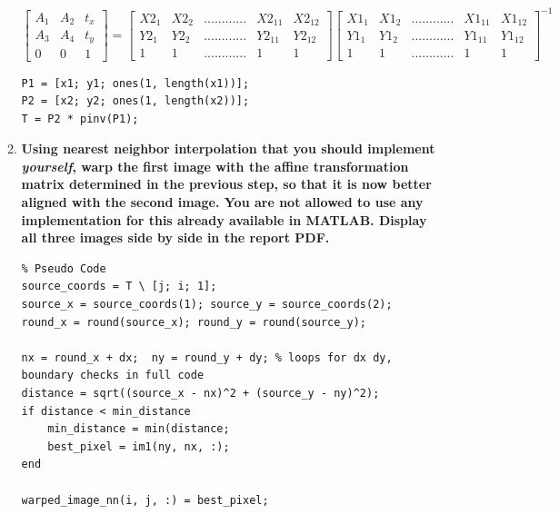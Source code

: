 \documentclass{article}
\begin{document}
\begin{enumerate}
\begin{enumerate}
\begin{equation}
    \begin{bmatrix}
    A_1 & A_2 & t_x\\
    A_3 & A_4 & t_y\\
    0 & 0 & 1
    \end{bmatrix}
          =
    \begin{bmatrix}
        X2_1 & X2_2 & ............ & X2_{11} & X2_{12} \\
        Y2_1 & Y2_2 & ............ & Y2_{11} & Y2_{12} \\
        1    & 1    & ............ & 1     & 1
    \end{bmatrix}
    \begin{bmatrix}
        X1_1 & X1_2 & ............ & X1_{11} & X1_{12} \\
        Y1_1 & Y1_2 & ............ & Y1_{11} & Y1_{12} \\
        1    & 1    & ............ & 1     & 1
    \end{bmatrix}^{-1}
\end{equation}

\begin{verbatim}
P1 = [x1; y1; ones(1, length(x1))];
P2 = [x2; y2; ones(1, length(x2))];
T = P2 * pinv(P1);

\end{verbatim}

\item \textbf{Using nearest neighbor interpolation that you should implement \emph{yourself}, warp the first image with the affine transformation matrix determined in the previous step, so that it is now better aligned with the second image. You are not allowed to use any implementation for this already available in MATLAB. Display all three images side by side in the report PDF.}


\begin{verbatim}
% Pseudo Code
source_coords = T \ [j; i; 1];
source_x = source_coords(1); source_y = source_coords(2);
round_x = round(source_x); round_y = round(source_y);

nx = round_x + dx;  ny = round_y + dy; % loops for dx dy, boundary checks in full code
distance = sqrt((source_x - nx)^2 + (source_y - ny)^2);
if distance < min_distance
    min_distance = min(distance;
    best_pixel = im1(ny, nx, :);
end

warped_image_nn(i, j, :) = best_pixel;
\end{verbatim}


\end{enumerate}
\end{enumerate}
\end{document}
